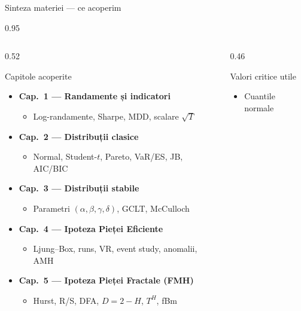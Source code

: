 \documentclass[9pt, aspectratio=169, t]{beamer}
\begin{document}
\begin{frame}[shrink=25]{Sinteza materiei --- ce acoperim}
\begin{cminipage}{0.95\textwidth}
\begin{columns}[T]
\begin{column}{0.52\textwidth}
\begin{block}{Capitole acoperite}
\small
\begin{itemize}\setlength{\itemsep}{0pt}
    \item \textbf{Cap.~1 --- Randamente și indicatori}
    \begin{itemize}\setlength{\itemsep}{0pt}
        \item Log-randamente, Sharpe, MDD, scalare $\sqrt T$
    \end{itemize}
    \item \textbf{Cap.~2 --- Distribuții clasice}
    \begin{itemize}\setlength{\itemsep}{0pt}
        \item Normal, Student-$t$, Pareto, VaR/ES, JB, AIC/BIC
    \end{itemize}
    \item \textbf{Cap.~3 --- Distribuții stabile}
    \begin{itemize}\setlength{\itemsep}{0pt}
        \item Parametri $(\alpha, \beta, \gamma, \delta)$, GCLT, McCulloch
    \end{itemize}
    \item \textbf{Cap.~4 --- Ipoteza Pieței Eficiente}
    \begin{itemize}\setlength{\itemsep}{0pt}
        \item Ljung--Box, runs, VR, event study, anomalii, AMH
    \end{itemize}
    \item \textbf{Cap.~5 --- Ipoteza Pieței Fractale (FMH)}
    \begin{itemize}\setlength{\itemsep}{0pt}
        \item Hurst, R/S, DFA, $D=2-H$, $T^H$, fBm
    \end{itemize}
\end{itemize}
\end{block}
\end{column}
\begin{column}{0.46\textwidth}
\begin{alertblock}{Valori critice utile}
\small
\begin{itemize}\setlength{\itemsep}{0pt}
    \item Cuantile normale

\end{itemize}
\end{alertblock}
\end{column}
\end{columns}
\end{cminipage}
\end{frame}
\end{document}
